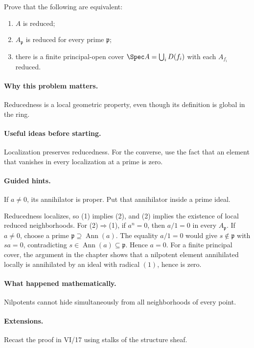 \begin{problem}
Prove that the following are equivalent:
\begin{enumerate}
\item $A$ is reduced;
\item $A_{\mathfrak p}$ is reduced for every prime $\mathfrak p$;
\item there is a finite principal-open cover $\Spec A=\bigcup_iD(f_i)$ with each $A_{f_i}$ reduced.
\end{enumerate}
\end{problem}
\paragraph{Why this problem matters.}
Reducedness is a local geometric property, even though its definition is global in the ring.
\paragraph{Useful ideas before starting.}
Localization preserves reducedness.  For the converse, use the fact that an element that
vanishes in every localization at a prime is zero.
\paragraph{Guided hints.}
If $a\neq0$, its annihilator is proper.  Put that annihilator inside a prime ideal.
\begin{solution}
Reducedness localizes, so (1) implies (2), and (2) implies the existence of local reduced
neighborhoods.  For (2)$\Rightarrow$(1), if $a^n=0$, then $a/1=0$ in every
$A_{\mathfrak p}$.  If $a\neq0$, choose a prime $\mathfrak p\supseteq\operatorname{Ann}(a)$.
The equality $a/1=0$ would give $s\notin\mathfrak p$ with $sa=0$, contradicting
$s\in\operatorname{Ann}(a)\subseteq\mathfrak p$.  Hence $a=0$.
For a finite principal cover, the argument in the chapter shows that a nilpotent element
annihilated locally is annihilated by an ideal with radical $(1)$, hence is zero.
\end{solution}
\paragraph{What happened mathematically.}
Nilpotents cannot hide simultaneously from all neighborhoods of every point.
\paragraph{Extensions.}
Recast the proof in VI/17 using stalks of the structure sheaf.
